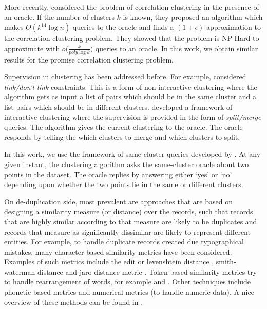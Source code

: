\documentclass[12pt]{article}
\begin{document}
More recently, \cite{ailon2018approximate} considered the problem of correlation clustering in the presence of an oracle. If the number of clusters $k$ is known, they proposed an algorithm which makes $O(k^{14} \log n)$ queries to the oracle and finds a $(1+\epsilon)$-approximation to the correlation clustering problem. They showed that the problem is NP-Hard to approximate with $o\big(\frac{k}{poly \log k}\big)$ queries to an oracle. In this work, we obtain similar results for the {promise correlation clustering} problem.

Supervision in clustering has been addressed before. For example, \cite{kulis2009semi,basu2004probabilistic,basu2002semi} considered {\em link/don't-link} constraints. This is a form of non-interactive clustering where the algorithm gets as input a list of pairs which should be in the same cluster and a list pairs which should be in different clusters. \cite{balcan2008clustering} developed a framework of interactive clustering where the supervision is provided in the form of {\em split/merge} queries. The algorithm gives the current clustering to the oracle. The oracle responds by telling the which clusters to merge and which clusters to split. 

In this work, we use the framework of same-cluster queries developed by \cite{ashtiani2016clustering}. At any given instant, the clustering algorithm asks the same-cluster oracle about two points in the dataset. The oracle replies by answering either `yes' or `no' depending upon whether the two points lie in the same or different clusters. 

On de-duplication side, most prevalent are approaches that are based on designing a similarity measure (or distance) over the records, such that records that are highly similar according to that measure are likely to be duplicates and records that measure as significantly dissimilar are likely to represent different entities. For example, to handle duplicate records created due typographical mistakes, many character-based similarity metrics have been considered. Examples of such metrics include the edit or levenshtein distance \cite{levenshtein1966binary}, smith-waterman distance \cite{waterman1981identification} and jaro distance metric \cite{jaro1980unimatch}. Token-based similarity metrics try to handle rearrangement of words, for example \cite{monge1996field} and \cite{cohen1998integration}. Other techniques include phonetic-based metrics and numerical metrics (to handle numeric data). A nice overview of these methods can be found in \cite{elmagarmid2007duplicate}. 
   
\end{document}
